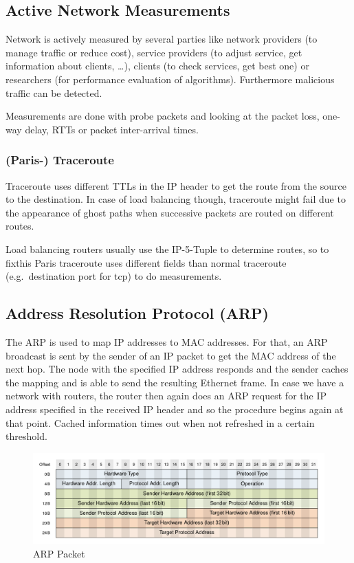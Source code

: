 \subsection{Active Network Measurements}
Network is actively measured by several parties like network providers (to manage traffic or reduce cost), service providers (to adjust service, get information about clients, \dots), clients (to check services, get best one) or researchers (for performance evaluation of algorithms).
Furthermore malicious traffic can be detected.
\vspace{5pt}

Measurements are done with probe packets and looking at the packet loss, one-way delay, RTTs or packet inter-arrival times.

\subsubsection*{(Paris-) Traceroute}
Traceroute uses different TTLs in the IP header to get the route from the source to the destination.
In case of load balancing though, traceroute might fail due to the appearance of ghost paths when successive packets are routed on different routes.

Load balancing routers usually use the IP-5-Tuple to determine routes, so to fixthis Paris traceroute uses different fields than normal traceroute (e.g.\ destination port for tcp) to do measurements.

\subsection{Address Resolution Protocol (ARP)}
The ARP is used to map IP addresses to MAC addresses.
For that, an ARP broadcast is sent by the sender of an IP packet to get the MAC address of the next hop.
The node with the specified IP address responds and the sender caches the mapping and is able to send the resulting Ethernet frame.
In case we have a network with routers, the router then again does an ARP request for the IP address specified in the received IP header and so the procedure begins again at that point.
Cached information times out when not refreshed in a certain threshold.
\begin{figure}[H]
  \centering
  \includegraphics[width=.8\textwidth]{figures/arp_packet.png}
  \caption{ARP Packet}\label{fig:arp_packet}
\end{figure}

